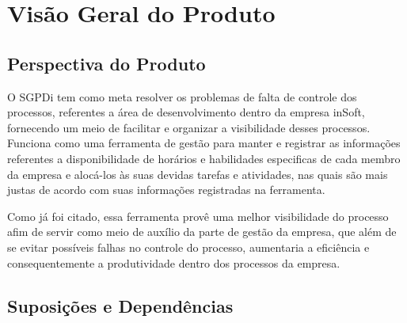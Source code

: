   \section{Visão Geral do Produto}

    \subsection{Perspectiva do Produto}

      O SGPDi tem como meta resolver os problemas de falta de controle dos processos, referentes a área de desenvolvimento dentro da empresa inSoft, fornecendo um meio de facilitar e organizar a visibilidade desses processos. Funciona como uma ferramenta de gestão para manter e registrar as informações referentes a disponibilidade de horários e habilidades especificas de cada membro da empresa e alocá-los às suas devidas tarefas e atividades, nas quais são mais justas de acordo com suas informações registradas na ferramenta.
      
      Como já foi citado, essa ferramenta provê uma melhor visibilidade do processo afim de servir como meio de auxílio da parte de gestão da empresa, que além de se evitar possíveis falhas no controle do processo, aumentaria a eficiência e consequentemente a produtividade dentro dos processos da empresa.


    \subsection{Suposições e Dependências}
        
